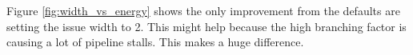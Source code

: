 \documentclass{article}
\newcommand{\optimisation}[1]{
  
}
\begin{document}
\begin{multicols}{2}
  Figure \ref{fig:width_vs_energy} shows the only improvement from the defaults are setting the issue width to 2. This might help because the high branching factor is causing a lot of pipeline stalls. This makes a huge difference.

  \optimisation{width}

\end{multicols}
\end{document}
